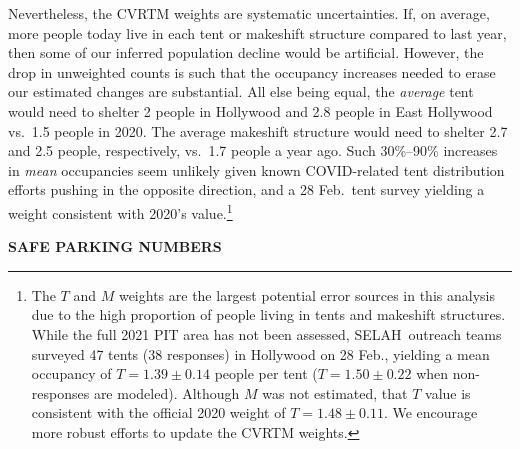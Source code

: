\documentclass[11pt]{article}
\def\bfr{\bf\color{red}}
\def\resp{respectively}
\def\selah{SELAH}
\begin{document}
Nevertheless, the CVRTM weights are systematic uncertainties. If, on average, more people today live in each tent 
or makeshift structure compared to last year, then some of our inferred population decline would be artificial. 
However, the drop in unweighted counts is such that the occupancy increases needed to erase our estimated changes are
substantial. All else being equal, the {\it average} tent would need to shelter 2 people in Hollywood and 2.8 people in 
East Hollywood vs.\ 1.5 people in 2020. The average makeshift structure would need to shelter 2.7 and 2.5 people, 
\resp, vs.\ 1.7 people a year ago. Such 30\%--90\% increases in {\it mean} occupancies seem unlikely given 
known COVID-related tent distribution efforts pushing in the opposite direction, and a 28 Feb.\ tent survey 
yielding a weight consistent with 2020's value.\footnote{The $T$ and $M$ weights are the largest 
potential error sources in this analysis due to the high proportion of people living in tents and makeshift structures. 
While the full 2021 PIT area has not been assessed, \selah\ outreach teams surveyed 47 tents (38 responses) in 
Hollywood on 28 Feb., yielding a mean occupancy of $T=1.39\pm0.14$ people per tent ($T=1.50\pm0.22$ when 
non-responses are modeled). Although $M$ was not estimated, that $T$ value is consistent with the official 2020 
weight of $T=1.48\pm0.11$. We encourage more robust efforts to update the CVRTM weights.} 

{\bfr SAFE PARKING NUMBERS}
\end{document}
